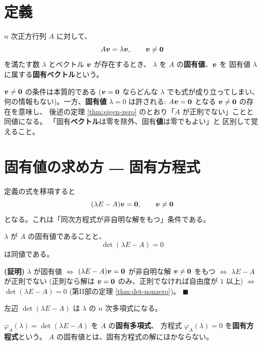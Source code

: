 \section{定義}

\begin{teigi}
$n$ 次正方行列 $A$ に対して、
\[
A\bm{v} = \lambda \bm{v}, \qquad \bm{v} \neq \bm{0}
\]
を満たす数 $\lambda$ とベクトル $\bm{v}$ が存在するとき、
$\lambda$ を $A$ の\textbf{固有値}、$\bm{v}$ を
固有値 $\lambda$ に属する\textbf{固有ベクトル}という。
\end{teigi}

\begin{chui}[$\vect{v} \neq \vect{0}$ と $\lambda = 0$]
$\vect{v} \neq \vect{0}$ の条件は本質的である
($\bm{v} = \bm{0}$ ならどんな $\lambda$ でも式が成り立ってしまい、
何の情報もない)。一方、\textbf{固有値} $\lambda = 0$ は許される:
$A\bm{v} = \bm{0}$ となる $\vect{v} \neq \vect{0}$ の存在を意味し、
後述の定理 \ref{thm:eigen-zero} のとおり「$A$ が正則でない」ことと同値になる。
「固有\textbf{ベクトル}は零を除外、固有\textbf{値}は零でもよい」と
区別して覚えること。
\end{chui}

\section{固有値の求め方 ― 固有方程式}

定義の式を移項すると
\[
(\lambda E - A)\bm{v} = \bm{0}, \qquad \bm{v} \neq \bm{0}
\]
となる。これは「同次方程式が非自明な解をもつ」条件である。

\begin{teiri}[固有値の特徴づけ]\label{thm:eigen-char}
$\lambda$ が $A$ の固有値であることと、
\[
\det(\lambda E - A) = 0
\]
は同値である。
\end{teiri}

\noindent\textbf{(証明)}\quad
$\lambda$ が固有値
$\iff$ $(\lambda E - A)\bm{v} = \bm{0}$ が非自明な解 $\vect{v} \neq \vect{0}$
をもつ
$\iff$ $\lambda E - A$ が正則でない
(正則なら解は $\bm{v} = \bm{0}$ のみ、正則でなければ自由度が $1$ 以上)
$\iff$ $\det(\lambda E - A) = 0$
(第II部の定理 \ref{thm:det-nonzero})。 $\blacksquare$

左辺 $\det(\lambda E - A)$ は $\lambda$ の $n$ 次多項式になる。

\begin{teigi}[固有多項式]
$\varphi_A(\lambda) = \det(\lambda E - A)$ を $A$ の\textbf{固有多項式}、
方程式 $\varphi_A(\lambda) = 0$ を\textbf{固有方程式}という。
$A$ の固有値とは、固有方程式の解にほかならない。
\end{teigi}

